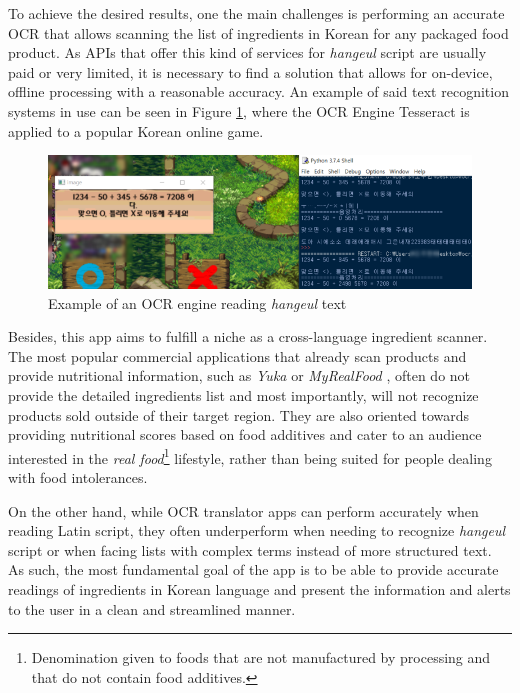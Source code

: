To achieve the desired results, one the main challenges is performing an accurate OCR that allows scanning the list of ingredients in Korean for any packaged food product. As APIs that offer this kind of services for \textit{hangeul} script are usually paid or very limited, it is necessary to find a solution that allows for on-device, offline processing with a reasonable accuracy. An example of said text recognition systems in use can be seen in Figure \ref{fig:maplestory}, where the OCR Engine Tesseract \cite{noauthor_tesseract_2021} is applied to a popular Korean online game.

\begin{figure}[h]
  \centering
  \includegraphics[width=\textwidth]{Figures/maplestory.png}
  \caption{%
    Example of an OCR engine reading \textit{hangeul} text
  }
  \label{fig:maplestory}
\end{figure}

Besides, this app aims to fulfill a niche as a cross-language ingredient scanner. The most popular commercial applications that already scan products and provide nutritional information, such as \textit{Yuka} \cite{noauthor_yuka_nodate-1} or \textit{MyRealFood} \cite{sl_myrealfood_nodate}, often do not provide the detailed ingredients list and most importantly, will not recognize products sold outside of their target region. They are also oriented towards providing nutritional scores based on food additives and cater to an audience interested in the \textit{real food}\footnote{Denomination given to foods that are not manufactured by processing and that do not contain food additives.} lifestyle, rather than being suited for people dealing with food intolerances.

On the other hand, while OCR translator apps can perform accurately when reading Latin script, they often underperform when needing to recognize \textit{hangeul} script or when facing lists with complex terms instead of more structured text. As such, the most fundamental goal of the app is to be able to provide accurate readings of ingredients in Korean language and present the information and alerts to the user in a clean and streamlined manner.

